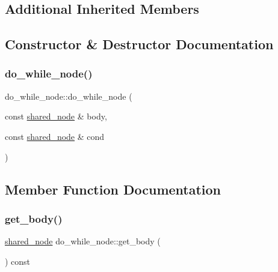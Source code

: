 \subsection*{Additional Inherited Members}


\subsection{Constructor \& Destructor Documentation}
\mbox{\label{classjawe_1_1do__while__node_a9d18fb637c871e855cb853ee3e3e0bf3}} 
\subsubsection{\texorpdfstring{do\+\_\+while\+\_\+node()}{do\_while\_node()}}
{\footnotesize\ttfamily do\+\_\+while\+\_\+node\+::do\+\_\+while\+\_\+node (\begin{DoxyParamCaption}\item[{const \hyperlink{namespacejawe_a3f307481d921b6cbb50cc8511fc2b544}{shared\+\_\+node} \&}]{body,  }\item[{const \hyperlink{namespacejawe_a3f307481d921b6cbb50cc8511fc2b544}{shared\+\_\+node} \&}]{cond }\end{DoxyParamCaption})}



\subsection{Member Function Documentation}
\mbox{\label{classjawe_1_1do__while__node_aea8cf6c53e681bc884eb785cdf52e9f5}} 
\subsubsection{\texorpdfstring{get\+\_\+body()}{get\_body()}}
{\footnotesize\ttfamily \hyperlink{namespacejawe_a3f307481d921b6cbb50cc8511fc2b544}{shared\+\_\+node} do\+\_\+while\+\_\+node\+::get\+\_\+body (\begin{DoxyParamCaption}{ }\end{DoxyParamCaption}) const}

